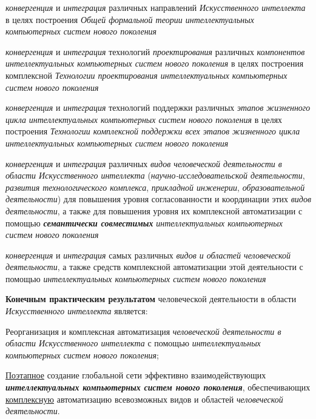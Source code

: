 \begin{textitemize}
	\item
	\textit{конвергенция} и \textit{интеграция} различных направлений \textit{Искусственного интеллекта} в целях построения \textit{Общей формальной теории интеллектуальных компьютерных систем нового поколения }
	\item
	\textit{конвергенция} и \textit{интеграция} технологий \textit{проектирования} различных \textit{компонентов интеллектуальных компьютерных систем нового поколения} в целях построения комплексной \textit{Технологии проектирования интеллектуальных компьютерных систем нового поколения }
	\item
	\textit{конвергенция} и \textit{интеграция} технологий поддержки различных \textit{этапов жизненного цикла} \textit{интеллектуальных компьютерных систем нового поколения} в целях построения \textit{Технологии комплексной поддержки всех этапов жизненного цикла интеллектуальных компьютерных систем нового поколения}
	\item
	\textit{конвергенция} и \textit{интеграция} различных \textit{видов человеческой деятельности в области Искусственного интеллекта} (\textit{научно-исследовательской деятельности}, \textit{развития технологического комплекса}, \textit{прикладной инженерии}, \textit{образовательной деятельности}) для повышения уровня согласованности и координации этих \textit{видов деятельности}, а также для повышения уровня их комплексной автоматизации с помощью \textbf{\textit{семантически совместимых}} \textit{интеллектуальных компьютерных систем нового поколения}
	\item
	\textit{конвергенция} и \textit{интеграция} самых различных \textit{видов и областей человеческой деятельности}, а также средств комплексной автоматизации этой деятельности с помощью \textit{интеллектуальных компьютерных систем нового поколения}
\end{textitemize}

\textbf{Конечным практическим результатом} человеческой деятельности в области \textit{Искусственного интеллекта} является:

\begin{textitemize}
	\item
	Реорганизация и комплексная автоматизация \textit{человеческой деятельности в области Искусственного интеллекта} с помощью \textit{интеллектуальных компьютерных систем нового поколения};
	\item
	\underline{Поэтапное} создание глобальной сети эффективно взаимодействующих \textbf{\textit{интеллектуальных компьютерных систем нового поколения}}, обеспечивающих \underline{комплексную} автоматизацию всевозможных видов и областей \textit{человеческой деятельности}.
\end{textitemize}

